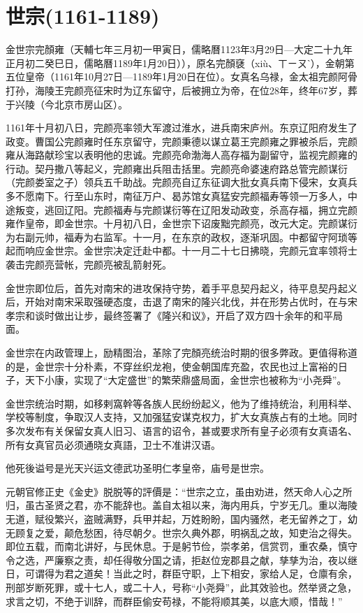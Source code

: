
\section{世宗\tiny(1161-1189)}

金世宗完顏雍（天輔七年三月初一甲寅日，儒略曆1123年3月29日—大定二十九年正月初二癸巳日，儒略曆1189年1月20日）），原名完顏褎（xiù、ㄒㄧㄡˋ），金朝第五位皇帝（1161年10月27日—1189年1月20日在位）。女真名乌禄，金太祖完颜阿骨打孙，海陵王完颜亮征宋时为辽东留守，后被拥立为帝，在位28年，终年67岁，葬于兴陵（今北京市房山区）。

1161年十月初八日，完颜亮率领大军渡过淮水，进兵南宋庐州。东京辽阳府发生了政变。曹国公完颜雍时任东京留守，完颜秉德以谋立葛王完颜雍之罪被杀后，完颜雍从海路献珍宝以表明他的忠诚。完颜亮命渤海人高存福为副留守，监视完颜雍的行动。契丹撒八等起义，完颜雍出兵阻击括里。完颜亮命婆速府路总管完颜谋衍（完颜娄室之子）领兵五千助战。完颜亮自辽东征调大批女真兵南下侵宋，女真兵多不愿南下。行至山东时，南征万户、曷苏馆女真猛安完颜福寿等领一万多人，中途叛变，逃回辽阳。完颜福寿与完颜谋衍等在辽阳发动政变，杀高存福，拥立完颜雍作皇帝，即金世宗。十月初八日，金世宗下诏废黜完颜亮，改元大定。完颜谋衍为右副元帅，福寿为右监军。十一月，在东京的政权，逐渐巩固。中都留守阿琐等起而响应金世宗。金世宗决定迁赴中都。十一月二十七日拂晓，完颜元宜率领将士袭击完颜亮营帐，完颜亮被乱箭射死。

金世宗即位后，首先对南宋的进攻保持守势，着手平息契丹起义，待平息契丹起义后，开始对南宋采取强硬态度，击退了南宋的隆兴北伐，并在形势占优时，在与宋孝宗和谈时做出让步，最终签署了《隆兴和议》，开启了双方四十余年的和平局面。

金世宗在内政管理上，励精图治，革除了完顏亮统治时期的很多弊政。更值得称道的是，金世宗十分朴素，不穿丝织龙袍，使金朝国库充盈，农民也过上富裕的日子，天下小康，实现了“大定盛世”的繁荣鼎盛局面，金世宗也被称为“小尧舜”。

金世宗统治时期，如移剌窩幹等各族人民纷纷起义，他为了维持统治，利用科举、学校等制度，争取汉人支持，又加强猛安谋克权力，扩大女真族占有的土地。同时多次发布有关保留女真人旧习、语言的诏令，甚或要求所有皇子必须有女真语名、所有女真官员必须通晓女真語，卫士不准讲汉语。

他死後谥号是光天兴运文德武功圣明仁孝皇帝，庙号是世宗。

元朝官修正史《金史》脱脱等的評價是：“世宗之立，虽由劝进，然天命人心之所归，虽古圣贤之君，亦不能辞也。盖自太祖以来，海内用兵，宁岁无几。重以海陵无道，赋役繁兴，盗贼满野，兵甲并起，万姓盼盼，国内骚然，老无留养之丁，幼无顾复之爱，颠危愁困，待尽朝夕。世宗久典外郡，明祸乱之故，知吏治之得失。即位五载，而南北讲好，与民休息。于是躬节俭，崇孝弟，信赏罚，重农桑，慎守令之选，严廉察之责，却任得敬分国之请，拒赵位宠郡县之献，孳孳为治，夜以继日，可谓得为君之道矣！当此之时，群臣守职，上下相安，家给人足，仓廪有余，刑部岁断死罪，或十七人，或二十人，号称“小尧舜”，此其效验也。然举贤之急，求言之切，不绝于训辞，而群臣偷安苟禄，不能将顺其美，以底大顺，惜哉！”

